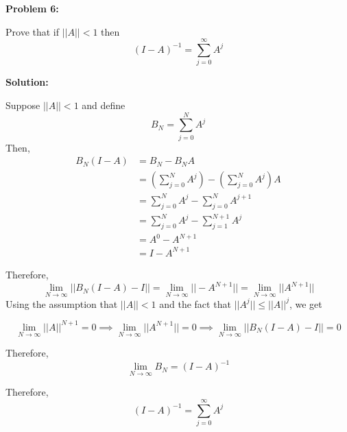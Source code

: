 \documentclass[12pt]{article}
\newenvironment{problem}[1]{
    \textbf{Problem #1:}
}{
    \rmfamily \vspace{1em}
}
\newenvironment{solution}{
    \textbf{Solution:}
    
}{
    
    \vspace{2em}
}
\begin{document}
\newpage

\begin{problem}{6}
    Prove that if \(||A|| < 1\) then
    \[
    (I - A)^{-1} = \sum_{j=0}^{\infty} A^j
    \]
\end{problem}

\begin{solution}
    Suppose \(||A|| < 1\) and define
    \[
    B_N = \sum_{j=0}^{N} A^j
    \]
    Then,
    \[
        \begin{aligned}
            B_N (I - A) &= B_N - B_N A \\
            &= \left(\sum_{j=0}^{N} A^j\right) - \left(\sum_{j=0}^{N} A^j\right) A \\
            &= \sum_{j=0}^{N} A^j - \sum_{j=0}^{N} A^{j+1} \\
            &= \sum_{j=0}^{N} A^j - \sum_{j=1}^{N+1} A^j\\
            &= A^0 - A^{N+1} \\
            &= I - A^{N+1}
        \end{aligned}
    \]

    Therefore,
    \[
        \lim_{N \to \infty} ||B_N (I - A) - I|| = \lim_{N \to \infty} ||-A^{N+1}|| = \lim_{N \to \infty} ||A^{N+1}||
    \]
    Using the assumption that \(||A|| < 1\) and the fact that \(||A^j|| \leq ||A||^j\), we get

    \[
        \lim_{N \to \infty} ||A||^{N+1} = 0 \implies \lim_{N \to \infty} ||A^{N+1}|| = 0 \implies \lim_{N \to \infty} ||B_N (I - A) - I|| = 0
    \]

    Therefore,
    \[
        \lim_{N \to \infty} B_N = (I - A)^{-1}
    \]

    Therefore,
    \[
        (I - A)^{-1} = \sum_{j=0}^{\infty} A^j
    \]
\end{solution}
\end{document}
